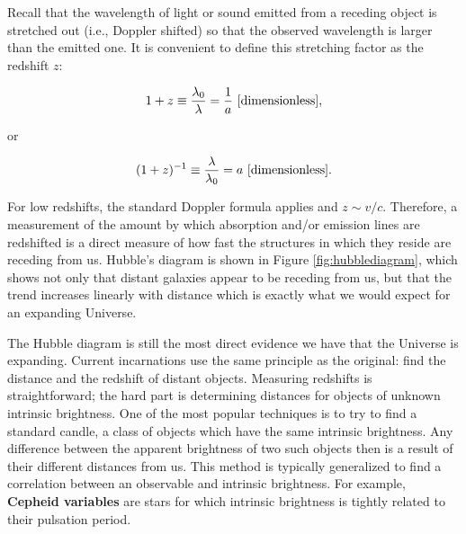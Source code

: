 \documentclass[a4paper,11pt]{article}
\begin{document}
{\noindent}Recall that the wavelength of light or sound emitted from a receding object is stretched out (i.e., Doppler shifted) so that the observed wavelength is larger than the emitted one. It is convenient to define this stretching factor as the redshift $z$:

\begin{align*}
    1+z \equiv \frac{\lambda_0}{\lambda} = \frac{1}{a} ~ [{\rm dimensionless}],
\end{align*}

{\noindent}or

\begin{align*}
    (1+z)^{-1} \equiv \frac{\lambda}{\lambda_0} = a ~ [{\rm dimensionless}].
\end{align*}

{\noindent}For low redshifts, the standard Doppler formula applies and $z \sim v/c$. Therefore, a measurement of the amount by which absorption and/or emission lines are redshifted is a direct measure of how fast the structures in which they reside are receding from us. Hubble's diagram is shown in Figure \ref{fig:hubblediagram}, which shows not only that distant galaxies appear to be receding from us, but that the trend increases linearly with distance which is exactly what we would expect for an expanding Universe.

{\noindent}The Hubble diagram is still the most direct evidence we have that the Universe is expanding. Current incarnations use the same principle as the original: find the distance and the redshift of distant objects. Measuring redshifts is straightforward; the hard part is determining distances for objects of unknown intrinsic brightness. One of the most popular techniques is to try to find a standard candle, a class of objects which have the same intrinsic brightness. Any difference between the apparent brightness of two such objects then is a result of their different distances from us. This method is typically generalized to find a correlation between an observable and intrinsic brightness. For example, \textbf{Cepheid variables} are stars for which intrinsic brightness is tightly related to their pulsation period.
\end{document}

